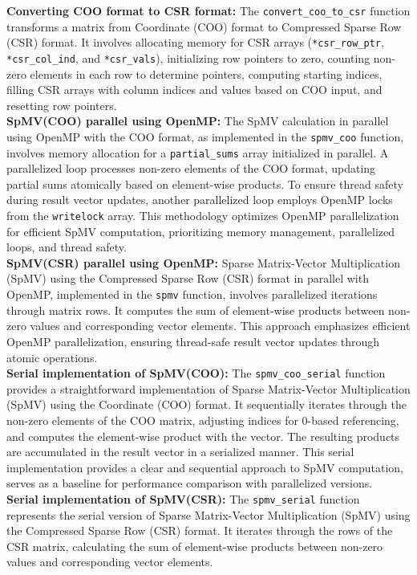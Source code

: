 \documentclass[11pt, twocolumn]{article}
\begin{document}
 \textbf{Converting COO format to CSR format:} The \texttt{convert\_coo\_to\_csr} function transforms a matrix from Coordinate (COO) format to Compressed Sparse Row (CSR) format. It involves allocating memory for CSR arrays (\texttt{*csr\_row\_ptr}, \texttt{*csr\_col\_ind}, and \texttt{*csr\_vals}), initializing row pointers to zero, counting non-zero elements in each row to determine pointers, computing starting indices, filling CSR arrays with column indices and values based on COO input, and resetting row pointers. 
 \vspace{7pt}
\\
\textbf{SpMV(COO) parallel using OpenMP:} The SpMV calculation in parallel using OpenMP with the COO format, as implemented in the \texttt{spmv\_coo} function, involves memory allocation for a \texttt{partial\_sums} array initialized in parallel. A parallelized loop processes non-zero elements of the COO format, updating partial sums atomically based on element-wise products. To ensure thread safety during result vector updates, another parallelized loop employs OpenMP locks from the \texttt{writelock} array. This methodology optimizes OpenMP parallelization for efficient SpMV computation, prioritizing memory management, parallelized loops, and thread safety.
\vspace{7pt}
\\
\textbf{SpMV(CSR) parallel using OpenMP:} Sparse Matrix-Vector Multiplication (SpMV) using the Compressed Sparse Row (CSR) format in parallel with OpenMP, implemented in the \texttt{spmv} function, involves parallelized iterations through matrix rows. It computes the sum of element-wise products between non-zero values and corresponding vector elements. This approach emphasizes efficient OpenMP parallelization, ensuring thread-safe result vector updates through atomic operations. 
\vspace{7pt}
\\
\textbf{Serial implementation of SpMV(COO):} The \texttt{spmv\_coo\_serial} function provides a straightforward implementation of Sparse Matrix-Vector Multiplication (SpMV) using the Coordinate (COO) format. It sequentially iterates through the non-zero elements of the COO matrix, adjusting indices for 0-based referencing, and computes the element-wise product with the vector. The resulting products are accumulated in the result vector in a serialized manner. This serial implementation provides a clear and sequential approach to SpMV computation, serves as a baseline for performance comparison with parallelized versions.
\vspace{7pt}
\\
\textbf{Serial implementation of SpMV(CSR):} The \texttt{spmv\_serial} function represents the serial version of Sparse Matrix-Vector Multiplication (SpMV) using the Compressed Sparse Row (CSR) format. It iterates through the rows of the CSR matrix, calculating the sum of element-wise products between non-zero values and corresponding vector elements. 
\end{document}
